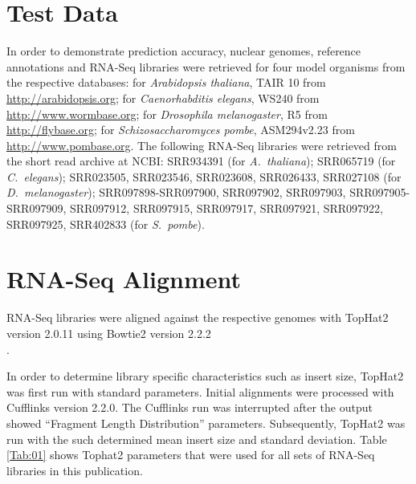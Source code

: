 \documentclass[a4paper,10pt]{report}
\begin{document}
\section{Test Data}

In order to demonstrate prediction accuracy, nuclear genomes, reference annotations and RNA-Seq libraries were retrieved for four model organisms from the respective databases: for \textit{Arabidopsis thaliana}, TAIR 10 from \url{http://arabidopsis.org}; for \textit{Caenorhabditis elegans}, WS240 from \url{http://www.wormbase.org}; for \textit{Drosophila melanogaster}, R5 from \url{http://flybase.org}; for \textit{Schizosaccharomyces pombe}, ASM294v2.23 from \url{http://www.pombase.org}. The following RNA-Seq libraries were retrieved from the short read archive at NCBI: SRR934391 (for \textit{A.~thaliana}); SRR065719 (for \textit{C.~elegans}); SRR023505, SRR023546, SRR023608, SRR026433, SRR027108 (for \textit{D.~melanogaster}); SRR097898-SRR097900, SRR097902, SRR097903,
SRR097905-SRR097909, SRR097912, SRR097915, SRR097917, SRR097921, SRR097922, SRR097925, SRR402833 (for \textit{S.~pombe}).

\section{RNA-Seq Alignment}

RNA-Seq libraries were aligned against the respective genomes with TopHat2 version 2.0.11 \cite{TopHat2} using Bowtie2 version 2.2.2\\ \cite{Bowtie2}.

In order to determine library specific characteristics such as insert size, TopHat2 was first run with standard parameters. Initial alignments were processed with Cufflinks \cite{Cufflinks} version 2.2.0. The Cufflinks run was interrupted after the output showed ``Fragment Length Distribution'' parameters. Subsequently, TopHat2 was run with the such determined mean insert size and standard deviation. Table \ref{Tab:01} shows Tophat2 parameters that were used for all sets of RNA-Seq libraries in this publication.
\end{document}
